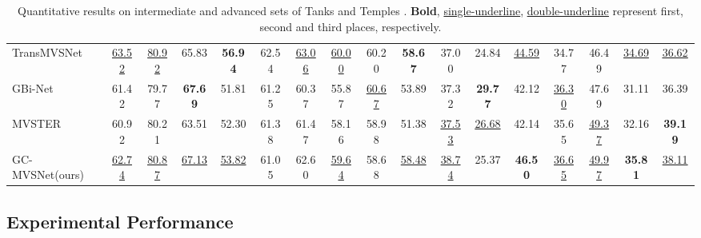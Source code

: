 \documentclass[10pt,twocolumn,letterpaper]{article}
\begin{document}
\begin{table*}[ht]
\begin{center}
\begin{tabular}{lccccccccc|ccccccc}
    TransMVSNet \cite{ding2022transmvsnet} & \underline{63.52} & \underline{80.92} & 65.83 & \textbf{56.94} & 62.54 & \underline{\underline{63.06}} & \underline{60.00} & 60.20 & \textbf{58.67}  & 37.00 & 24.84 & \underline{44.59} & 34.77 & 46.49 & \underline{34.69} & \underline{\underline{36.62 }}\\
    GBi-Net \cite{mi2022gbi}  & 61.42 & 79.77 & \textbf{67.69} & 51.81 & 61.25 & 60.37 & 55.87 & \underline{\underline{60.67}} & 53.89 & 37.32 & \textbf{29.77} & 42.12 & \underline{\underline{36.30}} & 47.69 & 31.11 & 36.39  \\
    MVSTER \cite{wang2022mvster}  & 60.92 & 80.21 & 63.51 & 52.30 & 61.38 & 61.47 & 58.16 & 58.98 & 51.38 & \underline{\underline{37.53}} & \underline{\underline{26.68}} & 42.14 & 35.65 & \underline{\underline{49.37}} & 32.16 & \textbf{39.19}  \\
    \midrule
    GC-MVSNet(ours) & \underline{\underline{62.74}}  & \underline{\underline{80.87}}  & \underline{67.13}  &  \underline{53.82} & 61.05  & 62.60  & \underline{\underline{59.64}}  &  58.68 &  \underline{58.48} & \underline{38.74} & 25.37  &  \textbf{46.50} & \underline{36.65} & \underline{49.97} & \textbf{35.81} & \underline{38.11}\\ 
    \bottomrule
    \end{tabular}
    \vspace{-5pt}
    \caption{Quantitative results on intermediate and advanced sets of Tanks and Temples \cite{Knapitsch2017tnt}. \textbf{Bold}, \underline{single-underline}, \underline{\underline{double-underline}} represent first, second and third places, respectively.}
    \label{table:quantitative-comparison-tanks-and-temples}
    \vspace{-25pt}
\end{center}
\end{table*}
\endgroup



\subsection{Experimental Performance}\label{sec:experimental-performance}

\vspace{-3pt}
\end{document}
